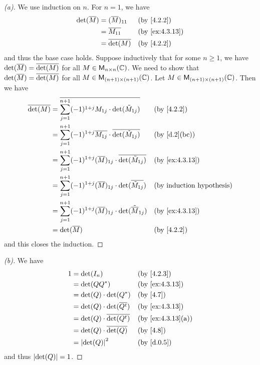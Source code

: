 \begin{proof}[(a)]
	We use induction on \(n\).
	For \(n = 1\), we have
	\begin{align*}
		\det(\conj{M}) & = (\conj{M})_{1 1} &  & \by{4.2.2}     \\
		               & = \conj{M_{1 1}}   &  & \by{ex:4.3.13} \\
		               & = \conj{\det(M)}   &  & \by{4.2.2}
	\end{align*}
	and thus the base case holds.
	Suppose inductively that for some \(n \geq 1\), we have \(\det(\overline{M}) = \overline{\det(M)}\) for all \(M \in \ms[n][n][\C]\).
	We need to show that \(\det(\overline{M}) = \overline{\det(M)}\) for all \(M \in \ms[(n + 1)][(n + 1)][\C]\).
	Let \(M \in \ms[(n + 1)][(n + 1)][\C]\).
	Then we have
	\begin{align*}
		\conj{\det(M)} & = \conj{\sum_{j = 1}^{n + 1} (-1)^{1 + j} M_{1 j} \cdot \det(\tilde{M}_{1 j})}          &  & \by{4.2.2}                       \\
		               & = \sum_{j = 1}^{n + 1} (-1)^{1 + j} \conj{M_{1 j}} \cdot \conj{\det(\tilde{M}_{1 j})}   &  & \by{d.2}[bc]                     \\
		               & = \sum_{j = 1}^{n + 1} (-1)^{1 + j} (\conj{M})_{1 j} \cdot \conj{\det(\tilde{M}_{1 j})} &  & \by{ex:4.3.13}                   \\
		               & = \sum_{j = 1}^{n + 1} (-1)^{1 + j} (\conj{M})_{1 j} \cdot \det(\conj{\tilde{M}_{1 j}}) &  & \text{(by induction hypothesis)} \\
		               & = \sum_{j = 1}^{n + 1} (-1)^{1 + j} (\conj{M})_{1 j} \cdot \det(\tilde{\conj{M}}_{1 j}) &  & \by{ex:4.3.13}                   \\
		               & = \det(\conj{M})                                                                        &  & \by{4.2.2}
	\end{align*}
	and this closes the induction.
\end{proof}

\begin{proof}[(b)]
	We have
	\begin{align*}
		1 & = \det(I_n)                         &  & \by{4.2.3}        \\
		  & = \det(Q Q^*)                       &  & \by{ex:4.3.13}    \\
		  & = \det(Q) \cdot \det(Q^*)           &  & \by{4.7}          \\
		  & = \det(Q) \cdot \det(\conj{\tp{Q}}) &  & \by{ex:4.3.13}    \\
		  & = \det(Q) \cdot \conj{\det(\tp{Q})} &  & \by{ex:4.3.13}[a] \\
		  & = \det(Q) \cdot \conj{\det(Q)}      &  & \by{4.8}          \\
		  & = \abs{\det(Q)}^2                   &  & \by{d.0.5}
	\end{align*}
	and thus \(\left\lvert\det(Q)\right\rvert = 1\).
\end{proof}

